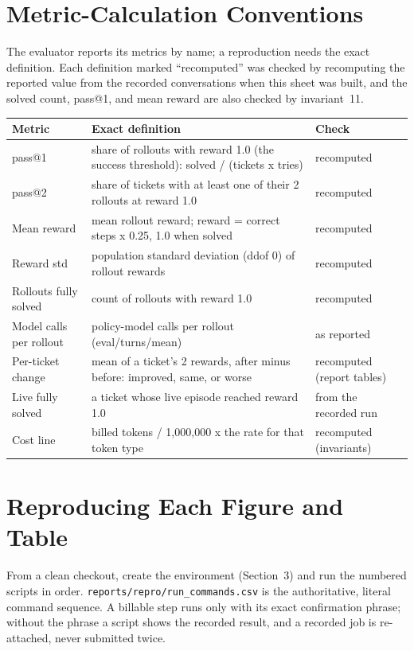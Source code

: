 \documentclass[11pt]{article}
\begin{document}
\section{Metric-Calculation Conventions}
The evaluator reports its metrics by name; a reproduction needs the exact definition. Each definition marked
``recomputed'' was checked by recomputing the reported value from the recorded conversations when this sheet
was built, and the solved count, pass@1, and mean reward are also checked by invariant~11.
\begin{center}
\begin{minipage}{\linewidth}\centering
\begin{tabular}{P{3.2cm}P{8.6cm}P{3.4cm}}
\toprule
\textbf{Metric} & \textbf{Exact definition} & \textbf{Check} \\
\midrule
pass@1 & share of rollouts with reward 1.0 (the success threshold): solved / (tickets x tries) & recomputed \\
pass@2 & share of tickets with at least one of their 2 rollouts at reward 1.0 & recomputed \\
Mean reward & mean rollout reward; reward = correct steps x 0.25, 1.0 when solved & recomputed \\
Reward std & population standard deviation (ddof 0) of rollout rewards & recomputed \\
Rollouts fully solved & count of rollouts with reward 1.0 & recomputed \\
Model calls per rollout & policy-model calls per rollout (eval/turns/mean) & as reported \\
Per-ticket change & mean of a ticket's 2 rewards, after minus before: improved, same, or worse & recomputed (report tables) \\
Live fully solved & a ticket whose live episode reached reward 1.0 & from the recorded run \\
Cost line & billed tokens / 1,000,000 x the rate for that token type & recomputed (invariants) \\
\bottomrule
\end{tabular}
\end{minipage}
\end{center}

\section{Reproducing Each Figure and Table}
From a clean checkout, create the environment (Section~3) and run the numbered scripts in order.
\texttt{reports/repro/run\_commands.csv} is the authoritative, literal command sequence. A billable step runs
only with its exact confirmation phrase; without the phrase a script shows the recorded result, and a recorded
job is re-attached, never submitted twice.
\end{document}
